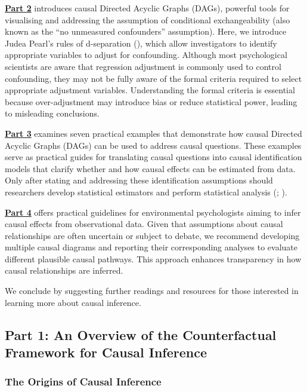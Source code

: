 \documentclass[
  singlecolumn]{article}
\begin{document}
\hyperref[section-part2]{\textbf{Part 2}} introduces causal Directed
Acyclic Graphs (DAGs), powerful tools for visualising and addressing the
assumption of conditional exchangeability (also known as the ``no
unmeasured confounders'' assumption). Here, we introduce Judea Pearl's
rules of d-separation (), which
allow investigators to identify appropriate variables to adjust for
confounding. Although most psychological scientists are aware that
regression adjustment is commonly used to control confounding, they may
not be fully aware of the formal criteria required to select appropriate
adjustment variables. Understanding the formal criteria is essential
because over-adjustment may introduce bias or reduce statistical power,
leading to misleading conclusions.

\hyperref[section-part3]{\textbf{Part 3}} examines seven practical
examples that demonstrate how causal Directed Acyclic Graphs (DAGs) can
be used to address causal questions. These examples serve as practical
guides for translating causal questions into causal identification
models that clarify whether and how causal effects can be estimated from
data. Only after stating and addressing these identification assumptions
should researchers develop statistical estimators and perform
statistical analysis (; ).

\hyperref[section-part4]{\textbf{Part 4}} offers practical guidelines
for environmental psychologists aiming to infer causal effects from
observational data. Given that assumptions about causal relationships
are often uncertain or subject to debate, we recommend developing
multiple causal diagrams and reporting their corresponding analyses to
evaluate different plausible causal pathways. This approach enhances
transparency in how causal relationships are inferred.

We conclude by suggesting further readings and resources for those
interested in learning more about causal inference.

\subsection{Part 1: An Overview of the Counterfactual Framework for
Causal Inference}\label{section-part1}

\subsubsection{The Origins of Causal
Inference}\label{the-origins-of-causal-inference}
\end{document}
